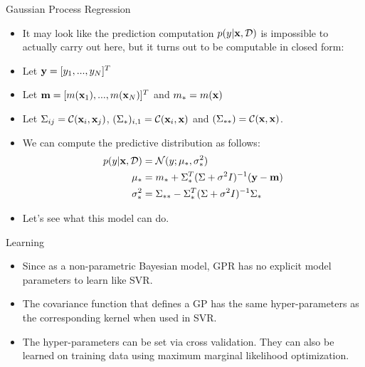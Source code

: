 \documentclass[serif,xcolor=pdftex,dvipsnames,table,hyperref={bookmarks=false,breaklinks}]{beamer}
\begin{document}
\begin{frame}[t]{Gaussian Process Regression}

\begin{itemize}
\item It may look like the prediction computation $p(y|{\mathbf{x}},\mathcal{D})$ is 
impossible to actually carry out here, but it turns out to be computable in 
closed form:

\pause \item Let ${\mathbf{y}} = [y_1,...,y_N]^T$ 

\pause \item Let ${\mathbf{m}} = [m({\mathbf{x}}_1),...,m({\mathbf{x}}_N)]^T$ and $m_* = 
m({\mathbf{x}})$
\pause \item Let $\Sigma_{ij} = \mathcal{C}({\mathbf{x}}_i,{\mathbf{x}}_j)$, 
$(\Sigma_*)_{i,1} = \mathcal{C}({\mathbf{x}}_i,{\mathbf{x}})$ and $(\Sigma_{**}) = 
\mathcal{C}({\mathbf{x}},{\mathbf{x}})$.

\pause\item We can compute the predictive distribution as follows:
\begin{align*}
  p(y|{\mathbf{x}},\mathcal{D}) &= \mathcal{N}(y; \mu_*,\sigma^2_*)\\
  \mu_* &= m_* + \Sigma_*^T (\Sigma + \sigma^2I)^{-1} ({\mathbf{y}} - 
{\mathbf{m}})\\
  \sigma^2_*& = \Sigma_{**} - \Sigma_*^T (\Sigma + \sigma^2I)^{-1}\Sigma_*
\end{align*}

\pause\item Let's see what this model can do.


\end{itemize}

\end{frame}

\begin{frame}[t]{Learning}

\begin{itemize}
\item Since as a non-parametric Bayesian model, GPR has no explicit model 
parameters to learn like SVR. 

\pause\item The covariance function that defines a GP has the same 
hyper-parameters as the corresponding kernel when used in SVR.

\pause\item The hyper-parameters can be set via cross validation. They can also
be learned on training data using maximum marginal likelihood optimization.

\end{itemize}

\end{frame}
\end{document}
